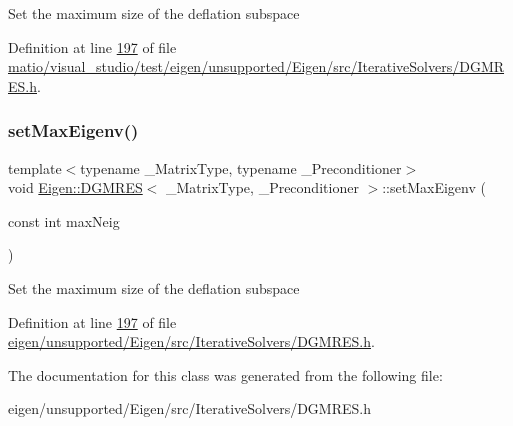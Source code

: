 Set the maximum size of the deflation subspace 

Definition at line \hyperlink{matio_2visual__studio_2test_2eigen_2unsupported_2_eigen_2src_2_iterative_solvers_2_d_g_m_r_e_s_8h_source_l00197}{197} of file \hyperlink{matio_2visual__studio_2test_2eigen_2unsupported_2_eigen_2src_2_iterative_solvers_2_d_g_m_r_e_s_8h_source}{matio/visual\+\_\+studio/test/eigen/unsupported/\+Eigen/src/\+Iterative\+Solvers/\+D\+G\+M\+R\+E\+S.\+h}.

\mbox{\label{class_eigen_1_1_d_g_m_r_e_s_ada9f5fbba382ae941f207322a8b84a01}} 
\subsubsection{\texorpdfstring{set\+Max\+Eigenv()}{setMaxEigenv()}\hspace{0.1cm}{\footnotesize\ttfamily [2/2]}}
{\footnotesize\ttfamily template$<$typename \+\_\+\+Matrix\+Type, typename \+\_\+\+Preconditioner$>$ \\
void \hyperlink{class_eigen_1_1_d_g_m_r_e_s}{Eigen\+::\+D\+G\+M\+R\+ES}$<$ \+\_\+\+Matrix\+Type, \+\_\+\+Preconditioner $>$\+::set\+Max\+Eigenv (\begin{DoxyParamCaption}\item[{const int}]{max\+Neig }\end{DoxyParamCaption})\hspace{0.3cm}{\ttfamily [inline]}}

Set the maximum size of the deflation subspace 

Definition at line \hyperlink{eigen_2unsupported_2_eigen_2src_2_iterative_solvers_2_d_g_m_r_e_s_8h_source_l00197}{197} of file \hyperlink{eigen_2unsupported_2_eigen_2src_2_iterative_solvers_2_d_g_m_r_e_s_8h_source}{eigen/unsupported/\+Eigen/src/\+Iterative\+Solvers/\+D\+G\+M\+R\+E\+S.\+h}.



The documentation for this class was generated from the following file\+:\begin{DoxyCompactItemize}
\item 
eigen/unsupported/\+Eigen/src/\+Iterative\+Solvers/\+D\+G\+M\+R\+E\+S.\+h\end{DoxyCompactItemize}
